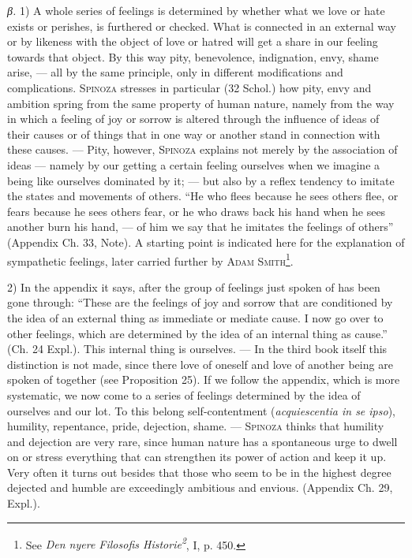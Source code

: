 \documentclass[12pt]{article}
\newcommand{\opage}[1]{\marginnote{\footnotesize\textit{[#1]}}}
\begin{document}
\textit{β.} 1) A whole series of feelings is determined by whether what we love or hate exists
or perishes, is furthered or checked. What is connected in an external way or by likeness with the
object of love or hatred will get a share in our feeling towards that object. By this way pity,
benevolence, indignation, envy, shame arise, --- all by the same principle, only in different
modifications and complications. \textsc{Spinoza} stresses in particular (32 Schol.) how pity,
envy and ambition spring from the same property of human nature, namely from the way in which a
feeling of joy or sorrow is altered through the influence of ideas of their causes or of things that
in one way or \opage{66}another stand in connection with these causes. --- Pity, however,
\textsc{Spinoza} explains not merely by the association of ideas --- namely by our getting a
certain feeling ourselves when we imagine a being like ourselves dominated by it; --- but also by a
reflex tendency to imitate the states and movements of others. ``He who flees because he sees
others flee, or fears because he sees others fear, or he who draws back his hand when he sees
another burn his hand, --- of him we say that he imitates the feelings of others'' (Appendix Ch.
33, Note). A starting point is indicated here for the explanation of sympathetic feelings, later
carried further by \textsc{Adam Smith}\footnote{See \textit{Den nyere Filosofis
Historie\textsuperscript{2}}, I, p. 450.}.

2) In the appendix it says, after the group of feelings just spoken of has been gone through:
``These are the feelings of joy and sorrow that are conditioned by the idea of an external thing as
immediate or mediate cause. I now go over to other feelings, which are determined by the idea of an
internal thing as cause.'' (Ch. 24 Expl.). This internal thing is ourselves. --- In the third book
itself this distinction is not made, since there love of oneself and love of another being are
spoken of together (see Proposition 25). If we follow the appendix, which is more systematic, we
now come to a series of feelings determined by the idea of ourselves and our lot. To this belong
self-contentment (\textit{acquiescentia in se ipso}), humility, repentance, pride, dejection,
shame. --- \textsc{Spinoza} thinks that humility and dejection are very rare, since human nature
has a spontaneous urge to dwell on or stress everything that can strengthen its power of action and
keep it up. Very often it turns out besides that those who seem to be in the highest degree
dejected and humble are exceedingly ambitious and envious. (Appendix Ch. 29, Expl.).
\end{document}
